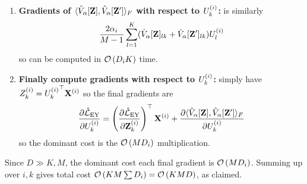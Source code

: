 \begin{enumerate}
    \item \textbf{Gradients of $\langle \hat{V}_\alpha[\mathbf{Z}], \hat{V}_\alpha[\mathbf{Z}'] \rangle_F$ with respect to $U^{(i)}_k$:}
    is similarly
    \begin{align*}
        \frac{2\alpha_i}{M-1}\sum_{l=1}^K (\hat{V}_\alpha[\mathbf{Z}]_{lk} + \hat{V}_\alpha[\mathbf{Z}']_{lk}) U_l^{(i)}
    \end{align*}
    so can be computed in $\mathcal{O}\left({D_i K}\right)$ time.

    \item \textbf{Finally compute gradients with respect to $U^{(i)}_k$:} simply have $Z^{(i)}_k = {U^{(i)}_k}^\top \mathbf{X}^{(i)}$ so the final gradients are
    \begin{align}
        \frac{\partial \hat{\mathcal{L}}_\text{EY}}{\partial U^{(i)}_k} = \left( \frac{\partial \hat{\mathcal{L}}_\text{EY}}{\partial \mathbf{Z}^{(i)}_k} \right)^\top {\mathbf{X}^{(i)}}
        + \frac{\partial \langle \hat{V}_\alpha[\mathbf{Z}], \hat{V}_\alpha[\mathbf{Z}'] \rangle_F}{\partial U^{(i)}_k}
    \end{align}
    so the dominant cost is the $\mathcal{O}\left({M D_i}\right)$ multiplication.
\end{enumerate}

Since $D \gg K, M$, the dominant cost each final gradient is $\mathcal{O}\left({M D_i}\right)$.
Summing up over $i,k$ gives total cost $\mathcal{O}\left({K M \sum D_i}\right) = \mathcal{O}\left({K M D}\right)$, as claimed.

\newpage